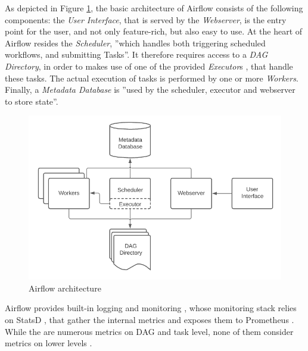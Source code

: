 \documentclass[lettersize,journal]{IEEEtran}
\begin{document}
As depicted in Figure \ref{fig:aiflow:arch}, the basic architecture of Airflow consists of the following components: the \textit{User Interface}, that is served by the \textit{Webserver}, is the entry point for the user, and not only feature-rich, but also easy to use. At the heart of Airflow resides the \textit{Scheduler}, ''which handles both triggering scheduled workflows, and submitting Tasks''\cite{airflowArchitecture}. It therefore requires access to a \textit{DAG Directory}, in order to makes use of one of the provided \textit{Executor}s \cite{airflowExecutor}, that handle these tasks. The actual execution of tasks is performed by one or more \textit{Workers}. Finally, a \textit{Metadata Database} is ''used by the scheduler, executor and webserver to store state''\cite{airflowArchitecture}.
\begin{figure}[h]
\includegraphics[width=\linewidth]{images/airflow-architecture.png}
\caption{Airflow architecture \cite{airflowArchitecture}}
\label{fig:aiflow:arch}
\end{figure}

Airflow provides built-in logging and monitoring \cite{airflowMonitoring}, whose monitoring stack relies on StatsD \cite{statsd}, that gather the internal metrics and exposes them to Prometheus \cite{prometheus}. While the are numerous metrics on DAG and task level, none of them consider metrics on lower levels \cite{airflowMetrics}.
\end{document}
